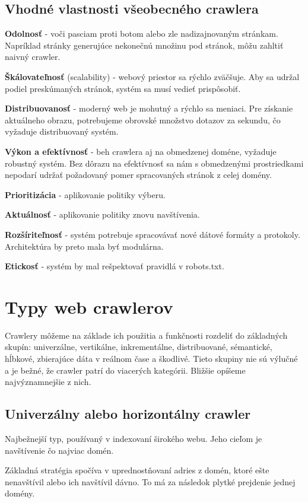 \subsection{Vhodné vlastnosti všeobecného crawlera}

\textbf{Odolnosť} - voči pasciam proti botom alebo zle nadizajnovaným stránkam. Napríklad stránky generujúce nekonečnú množinu pod stránok, môžu zahltiť naivný crawler. 

\textbf{Škálovateľnosť} (scalability) - webový priestor sa rýchlo zväčšuje. Aby sa udržal podiel preskúmaných stránok, systém sa musí 
vedieť prispôsobiť. 

\textbf{Distribuovanosť} -  moderný web je mohutný a rýchlo sa meniaci. Pre získanie aktuálneho obrazu, potrebujeme obrovské množstvo dotazov za sekundu, čo vyžaduje distribuovaný systém. 

\textbf{Výkon a efektívnosť} - beh crawlera aj na obmedzenej doméne, vyžaduje robustný systém. Bez dôrazu na efektívnosť sa nám s obmedzenými prostriedkami nepodarí udržať požadovaný pomer spracovaných stránok z celej domény.

\textbf{Prioritizácia} - aplikovanie politiky výberu.

\textbf{Aktuálnosť} - aplikovanie politiky znovu navštívenia.

\textbf{Rozšíriteľnosť} - systém potrebuje spracovávať nové dátové formáty a protokoly. Architektúra by preto mala byť modulárna. 

\textbf{Etickosť} - systém by mal rešpektovať pravidlá v robots.txt.

\section{Typy web crawlerov}
Crawlery môžeme na základe ich použitia a funkčnosti rozdeliť do základných skupín: univerzálne, vertikálne, inkrementálne, distribuované, sémantické, hĺbkové, zbierajúce dáta v reálnom čase a škodlivé. Tieto skupiny nie sú výlučné a je bežné, že crawler patrí do viacerých kategórii. Bližšie opíšeme najvýznamnejšie z nich. 

\subsection{Univerzálny alebo horizontálny crawler}
Najbežnejší typ, používaný v indexovaní širokého webu. Jeho cieľom je navštívenie čo najviac domén.

Základná stratégia spočíva v uprednostňovaní adries z domén, ktoré ešte nenavštívil alebo ich navštívil dávno. To má za následok plytké prejdenie jednej domény. 

